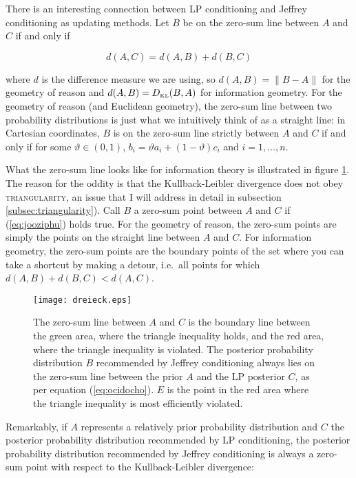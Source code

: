 \documentclass[11pt]{article}
\begin{document}
There is an interesting connection between LP conditioning and Jeffrey
conditioning as updating methods. Let $B$ be on the zero-sum line
between $A$ and $C$ if and only if

\begin{equation}
\label{eq:jooziphu}
d(A,C)=d(A,B)+d(B,C)
\end{equation}

where $d$ is the difference measure we are using, so $d(A,B)=\|B-A\|$
for the geometry of reason and $d(A,B)=D_{\mbox{\tiny KL}}(B,A)$ for
information geometry. For the geometry of reason (and Euclidean
geometry), the zero-sum line between two probability distributions is
just what we intuitively think of as a straight line: in Cartesian
coordinates, $B$ is on the zero-sum line strictly between $A$ and $C$
if and only if for some $\vartheta\in(0,1)$,
$b_{i}=\vartheta{}a_{i}+(1-\vartheta)c_{i}$ and $i=1,\ldots,n$.

What the zero-sum line looks like for information theory is
illustrated in figure \ref{fig:eugoohue}. The reason for the oddity is
that the Kullback-Leibler divergence does not obey
\textsc{triangularity}, an issue that I will address in detail in
subsection \ref{subsec:triangularity}). Call $B$ a zero-sum point
between $A$ and $C$ if (\ref{eq:jooziphu}) holds true. For the
geometry of reason, the zero-sum points are simply the points on the
straight line between $A$ and $C$. For information geometry, the
zero-sum points are the boundary points of the set where you can take a
shortcut by making a detour, i.e.\ all points for which
$d(A,B)+d(B,C)<d(A,C)$.

\begin{figure}[ht]
    \begin{minipage}[h]{.7\linewidth}
      \texttt{[image: dreieck.eps]}
      \caption{The zero-sum line between $A$ and $C$ is the boundary
        line between the green area, where the triangle inequality
        holds, and the red area, where the triangle inequality is
        violated. The posterior probability distribution $B$
        recommended by Jeffrey conditioning always lies on the
        zero-sum line between the prior $A$ and the LP posterior $C$,
        as per equation (\ref{eq:ocidocho}). $E$ is the point in the
        red area where the triangle inequality is most efficiently
        violated.}
      \label{fig:eugoohue}
\end{minipage}
\end{figure}

Remarkably, if $A$ represents a relatively prior probability
distribution and $C$ the posterior probability distribution
recommended by LP conditioning, the posterior probability distribution
recommended by Jeffrey conditioning is always a zero-sum point with
respect to the Kullback-Leibler divergence:
\end{document}
